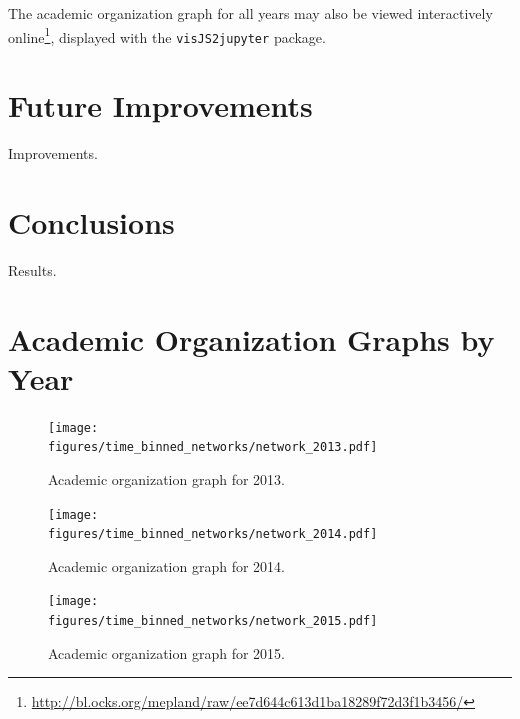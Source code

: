 \documentclass[notitlepage,aps,prd,nofootinbib]{revtex4-1}
\newcommand{\figures}{../outputs/plots}
\newcommand{\includedir}{../latex_files}
\begin{document}
The academic organization graph for all years may also be viewed interactively online\footnote{\url{http://bl.ocks.org/mepland/raw/ee7d644c613d1ba18289f72d3f1b3456/}}, displayed with the \texttt{visJS2jupyter} \cite{visJS2jupyter} package.

\section{Future Improvements}
Improvements.

\section{Conclusions}
Results.








\appendix*
\section{Academic Organization Graphs by Year}

\begin{figure}[!htb]\centering
  \texttt{[image: \\figures/time\_binned\_networks/network\_2013.pdf]}
  \caption{Academic organization graph for 2013.}
\end{figure}

\begin{figure}[!htb]\centering
  \texttt{[image: \\figures/time\_binned\_networks/network\_2014.pdf]}
  \caption{Academic organization graph for 2014.}
\end{figure}

\begin{figure}[!htb]\centering
  \texttt{[image: \\figures/time\_binned\_networks/network\_2015.pdf]}
  \caption{Academic organization graph for 2015.}
\end{figure}
\end{document}
